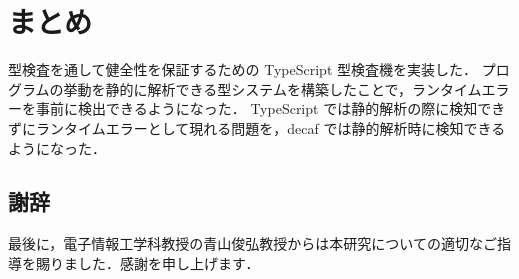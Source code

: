 \chapter{まとめ}

型検査を通して健全性を保証するための TypeScript 型検査機を実装した．
プログラムの挙動を静的に解析できる型システムを構築したことで，ランタイムエラーを事前に検出できるようになった．
TypeScript では静的解析の際に検知できずにランタイムエラーとして現れる問題を，decaf では静的解析時に検知できるようになった．

\section{謝辞}

最後に，電子情報工学科教授の青山俊弘教授からは本研究についての適切なご指導を賜りました．感謝を申し上げます．
